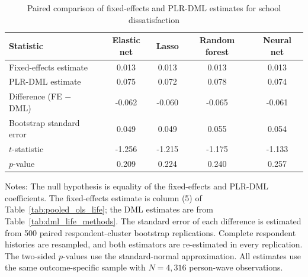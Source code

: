 \begin{table}[!htbp]
\centering
\caption{Paired comparison of fixed-effects and PLR-DML estimates for school dissatisfaction}
\label{tab:fe_plr_comparison_school_dissatisfaction}
\small
\setlength{\tabcolsep}{5pt}
\begin{tabular}{lcccc}
\hline
Statistic & Elastic net & Lasso & Random forest & Neural net
\\
\hline
Fixed-effects estimate & 0.013 & 0.013 & 0.013 & 0.013
\\
PLR-DML estimate & 0.075 & 0.072 & 0.078 & 0.074
\\
Difference (FE $-$ DML) & -0.062 & -0.060 & -0.065 & -0.061
\\
Bootstrap standard error & 0.049 & 0.049 & 0.055 & 0.054
\\
$t$-statistic & -1.256 & -1.215 & -1.175 & -1.133
\\
$p$-value & 0.209 & 0.224 & 0.240 & 0.257
\\
\hline
\end{tabular}
\begin{minipage}{0.96\textwidth}
\footnotesize Notes: The null hypothesis is equality of the fixed-effects and PLR-DML coefficients. The fixed-effects estimate is column (5) of Table~\ref{tab:pooled_ols_life}; the DML estimates are from Table~\ref{tab:dml_life_methods}. The standard error of each difference is estimated from 500 paired respondent-cluster bootstrap replications. Complete respondent histories are resampled, and both estimators are re-estimated in every replication. The two-sided $p$-values use the standard-normal approximation. All estimates use the same outcome-specific sample with $N=4,316$ person-wave observations.
\end{minipage}
\end{table}
